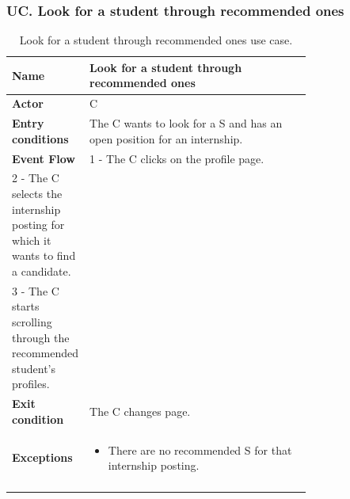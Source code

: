 \subsubsection*{UC\cuc . Look for a student through recommended ones}
\begin{center}
    \begin{longtable}{|l|p{0.75\linewidth}|}
        \hline
        \textbf{Name}               & Look for a student through recommended ones\\
        \hline
        \textbf{Actor}              & C\\
        \hline
        \textbf{Entry conditions}   & The C wants to look for a S and has an open position for an internship.\\
        \hline
        \textbf{Event Flow}         & 
        1 - The C clicks on the profile page. \\
        2 - The C selects the internship posting for which it wants to find a candidate. \\
        3 - The C starts scrolling through the recommended student’s profiles. \\
        \hline
        \textbf{Exit condition}   & The C changes page. \\       
        \hline
        \textbf{Exceptions}       & \begin{itemize}
            \item There are no recommended S for that internship posting.
        \end{itemize}\\
        \hline
        \caption{Look for a student through recommended ones use case.}
        \label{tab: look_for_student_use_case}
    \end{longtable}
\end{center}


